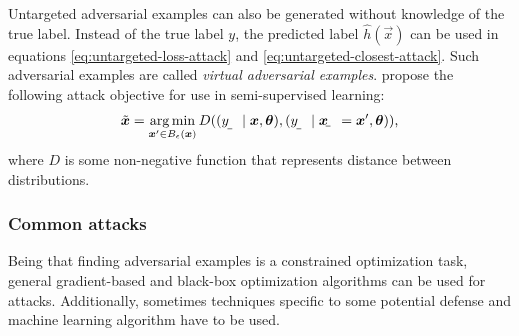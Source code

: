 \documentclass[twocolumn]{article}
\begin{document}
Untargeted adversarial examples can also be generated without knowledge of the true label. Instead of the true label $y$, the predicted label $\hat{h}(\vec x)$ can be used in equations \eqref{eq:untargeted-loss-attack} and \eqref{eq:untargeted-closest-attack}. Such adversarial examples are called \textit{virtual adversarial examples}.
\citet{Miyato:2017:VATRMSSSL} propose the following attack objective for use in semi-supervised learning:
\begin{align}
    \tilde{\vec x} = \argmin_{\vec x'\in B_\epsilon(\vec x)} D((\rvar y\mid \vec x, \vec\theta), (\rvar y\mid \rvec x = \vec x', \vec\theta)) \text{,}
\end{align}
where $D$ is some non-negative function that represents distance between distributions.

\subsubsection{Common attacks}

Being that finding adversarial examples is a constrained optimization task, general gradient-based and black-box optimization algorithms can be used for attacks. Additionally, sometimes techniques specific to some potential defense and machine learning algorithm have to be used.
\end{document}

